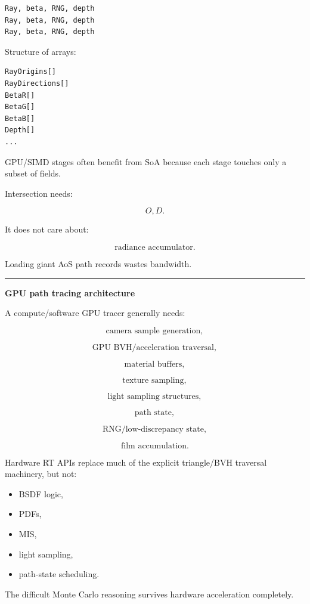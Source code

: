 \begin{verbatim}
Ray, beta, RNG, depth
Ray, beta, RNG, depth
Ray, beta, RNG, depth
\end{verbatim}

Structure of arrays:

\begin{verbatim}
RayOrigins[]
RayDirections[]
BetaR[]
BetaG[]
BetaB[]
Depth[]
...
\end{verbatim}

GPU/SIMD stages often benefit from SoA because each stage touches only a subset of fields.

Intersection needs:

\[
O,D.
\]

It does not care about:

\[
\text{radiance accumulator}.
\]

Loading giant AoS path records wastes bandwidth.

\begin{center}\rule{0.5\linewidth}{0.5pt}\end{center}

\textbf{GPU path tracing architecture}

A compute/software GPU tracer generally needs:

\[
\text{camera sample generation},
\]

\[
\text{GPU BVH/acceleration traversal},
\]

\[
\text{material buffers},
\]

\[
\text{texture sampling},
\]

\[
\text{light sampling structures},
\]

\[
\text{path state},
\]

\[
\text{RNG/low-discrepancy state},
\]

\[
\text{film accumulation}.
\]

Hardware RT APIs replace much of the explicit triangle/BVH traversal machinery, but not:

\begin{itemize}
\tightlist
\item
  BSDF logic,
\item
  PDFs,
\item
  MIS,
\item
  light sampling,
\item
  path-state scheduling.
\end{itemize}

The difficult Monte Carlo reasoning survives hardware acceleration completely.

